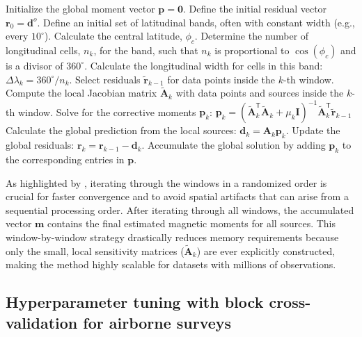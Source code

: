 \begin{algorithm}
\caption{Gradient-Boosted Equivalent Sources on the sphere.}
\label{alg:spherical-gradient-boosting}
\begin{algorithmic}[1]
\State Initialize the global moment vector $\mathbf{p} = \mathbf{0}$.
\State Define the initial residual vector $\mathbf{r}_0 = \mathbf{d}^o$.
\State Define an initial set of latitudinal bands, often with constant width (e.g., every $10^\circ$).
    \State Calculate the central latitude, $\phi_c$.
    \State Determine the number of longitudinal cells, $n_k$, for the band, such that $n_k$ is proportional to $\cos(\phi_c)$ and is a divisor of $360^\circ$.
    \State Calculate the longitudinal width for cells in this band: $\Delta\lambda_k = 360^\circ / n_k$.
\EndFor
{}
    \State Select residuals $\tilde{\mathbf{r}}_{k-1}$ for data points inside the $k$-th window.
    \State Compute the local Jacobian matrix $\tilde{\mathbf{A}}_k$ with data points and sources inside the $k$-th window.
    \State Solve for the corrective moments $\mathbf{p}_k$:
    \Statex \hspace{\algorithmicindent} $\mathbf{p}_k = (\tilde{\mathbf{A}}_k^\mathsf{T} \tilde{\mathbf{A}}_k + \mu_k \mathbf{I})^{-1} \tilde{\mathbf{A}}_k^\mathsf{T} \tilde{\mathbf{r}}_{k-1}$
    \State Calculate the global prediction from the local sources: $\mathbf{d}_k
    = \mathbf{A}_k \mathbf{p}_k$.
    \State Update the global residuals: $\mathbf{r}_k = \mathbf{r}_{k-1} - \mathbf{d}_k$.
    \State Accumulate the global solution by adding $\mathbf{p}_k$ to the
    corresponding entries in $\mathbf{p}$.
\EndFor
\end{algorithmic}
\end{algorithm}

As highlighted by \citet{Soler2021}, iterating through the windows in a randomized order is crucial
for faster convergence and to avoid spatial artifacts that can arise from a sequential processing
order. After iterating through all windows, the accumulated vector $\mathbf{m}$ contains the final
estimated magnetic moments for all sources. This window-by-window strategy drastically reduces memory
requirements because only the small, local sensitivity matrices ($\tilde{\mathbf{A}}_k$) are ever
explicitly constructed, making the method highly scalable for datasets with millions of observations.


\subsection{Hyperparameter tuning with block cross-validation for airborne surveys}

